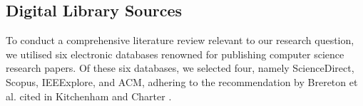 \subsection{Digital Library Sources}

To conduct a comprehensive literature review relevant to our research question, we utilised six electronic databases renowned for publishing computer science research papers. Of these six databases, we selected four, namely ScienceDirect, Scopus, IEEExplore, and ACM, adhering to the recommendation by  Brereton et al. \cite{BRERETON2007571} cited in Kitchenham and Charter \cite{kitchenham_guidelines_2007}.



